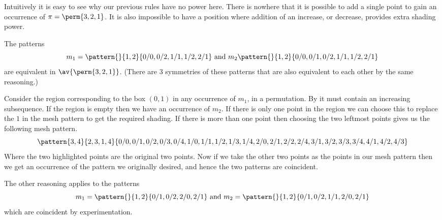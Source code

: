 Intuitively it is easy to see why our previous rules have no
power here. There is nowhere that it is possible to add a single point to
gain an occurrence of \(\pi = \perm{3,2,1}\). It is also impossible to have
a position where addition of an increase, or decrease, provides extra
shading power.

The patterns
\begin{equation*}
    m_1 = \pattern{}{1,2}{0/0, 0/2, 1/1, 1/2, 2/1} \text { and } m_2 \pattern{}{1,2}{0/0, 0/1, 0/2, 1/1, 1/2, 2/1}
\end{equation*}
are equivalent in \(\av{\perm{3,2,1}}\). (There are 3 symmetries of these
patterns that are also equivalent to each other by the same reasoning.)

Consider the region corresponding to the box \((0,1)\) in any occurrence of \(m_1\),
in a permutation. By  it must contain an increasing subsequence.
If the region is empty then we have an occurrence of \(m_2\).
If there is only one point in the region we can choose this to replace the \(1\) in
the mesh pattern to get the required shading. If there is more than one point then
choosing the two leftmost points gives us the following mesh pattern.
\begin{equation*}
    \pattern{3,4}{2,3,1,4}{0/0, 0/1, 0/2, 0/3, 0/4,
                            1/0, 1/1, 1/2, 1/3, 1/4,
                            2/0, 2/1,2/2, 2/4,
                            3/1, 3/2, 3/3, 3/4,
                            4/1, 4/2, 4/3}
\end{equation*}
Where the two highlighted points are the original two points.
Now if we take the other two points as the points in our
mesh pattern then we get an occurrence of the pattern
we originally desired, and hence the two patterns are coincident.

The other reasoning applies to the patterns
\begin{equation*}
    m_1 = \pattern{}{1,2}{0/1,0/2,2/0,2/1} \text{ and } m_2 = \pattern{}{1,2}{0/1,0/2,1/1,2/0,2/1}
\end{equation*}
which are coincident by experimentation.

